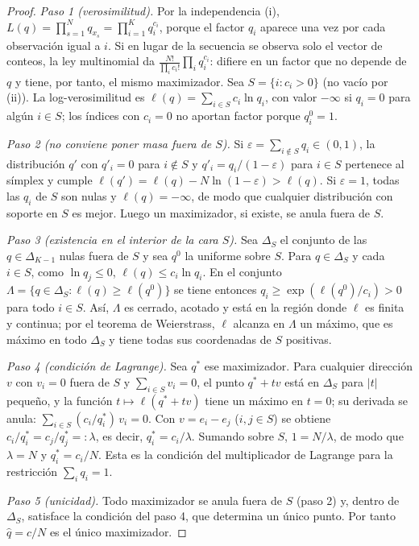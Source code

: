 \begin{proof}
\emph{Paso 1 (verosimilitud).} Por la independencia (i),
$L(q)=\prod_{s=1}^Nq_{x_s}=\prod_{i=1}^Kq_i^{c_i}$, porque el factor $q_i$ aparece
una vez por cada observación igual a $i$. Si en lugar de la secuencia se observa
solo el vector de conteos, la ley multinomial da
$\frac{N!}{\prod_ic_i!}\prod_iq_i^{c_i}$: difiere en un factor que no depende de
$q$ y tiene, por tanto, el mismo maximizador. Sea $S=\{i:c_i>0\}$ (no vacío por
(ii)). La log-verosimilitud es $\ell(q)=\sum_{i\in S}c_i\ln q_i$, con valor
$-\infty$ si $q_i=0$ para algún $i\in S$; los índices con $c_i=0$ no aportan
factor porque $q_i^0=1$.

\emph{Paso 2 (no conviene poner masa fuera de $S$).} Si
$\varepsilon=\sum_{i\notin S}q_i\in(0,1)$, la distribución $q'$ con $q'_i=0$ para
$i\notin S$ y $q'_i=q_i/(1-\varepsilon)$ para $i\in S$ pertenece al símplex y
cumple $\ell(q')=\ell(q)-N\ln(1-\varepsilon)>\ell(q)$. Si $\varepsilon=1$, todas
las $q_i$ de $S$ son nulas y $\ell(q)=-\infty$, de modo que cualquier distribución
con soporte en $S$ es mejor. Luego un maximizador, si existe, se anula fuera de $S$.

\emph{Paso 3 (existencia en el interior de la cara $S$).} Sea $\Delta_S$ el
conjunto de las $q\in\Delta_{K-1}$ nulas fuera de $S$ y sea $q^0$ la uniforme
sobre $S$. Para $q\in\Delta_S$ y cada $i\in S$, como $\ln q_j\le0$,
$\ell(q)\le c_i\ln q_i$. En el conjunto $\Lambda=\{q\in\Delta_S:\ell(q)\ge\ell(q^0)\}$
se tiene entonces $q_i\ge\exp(\ell(q^0)/c_i)>0$ para todo $i\in S$. Así, $\Lambda$
es cerrado, acotado y está en la región donde $\ell$ es finita y continua; por el
teorema de Weierstrass, $\ell$ alcanza en $\Lambda$ un máximo, que es máximo en
todo $\Delta_S$ y tiene todas sus coordenadas de $S$ positivas.

\emph{Paso 4 (condición de Lagrange).} Sea $q^*$ ese maximizador. Para cualquier
dirección $v$ con $v_i=0$ fuera de $S$ y $\sum_{i\in S}v_i=0$, el punto $q^*+tv$
está en $\Delta_S$ para $|t|$ pequeño, y la función $t\mapsto\ell(q^*+tv)$ tiene un
máximo en $t=0$; su derivada se anula:
$\sum_{i\in S}(c_i/q^*_i)\,v_i=0$. Con $v=e_i-e_j$ ($i,j\in S$) se obtiene
$c_i/q^*_i=c_j/q^*_j=:\lambda$, es decir, $q^*_i=c_i/\lambda$. Sumando sobre $S$,
$1=N/\lambda$, de modo que $\lambda=N$ y $q^*_i=c_i/N$. Esta es la condición del
multiplicador de Lagrange para la restricción $\sum_iq_i=1$.

\emph{Paso 5 (unicidad).} Todo maximizador se anula fuera de $S$ (paso 2) y,
dentro de $\Delta_S$, satisface la condición del paso 4, que determina un único
punto. Por tanto $\widehat q=c/N$ es el único maximizador.
\end{proof}
